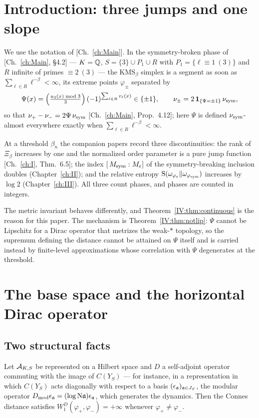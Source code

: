 \section{Introduction: three jumps and one slope}

We use the notation of [Ch.~\ref{ch:Main}]. In the symmetry-broken phase of [Ch.~\ref{ch:Main}, \S4.2] ---
$K=\mathbb{Q}$, $S=\{3\}\cup P_1\cup R$ with $P_1=\{\ell\equiv1\ (3)\}$ and $R$ infinite of primes
$\equiv2\ (3)$ --- the $\mathrm{KMS}_\beta$ simplex is a segment as soon as
$\sum_{\ell\in R}\ell^{-\beta}<\infty$, its extreme points $\varphi_\pm$ separated by
\begin{equation}\label{IV:eq:Psi}
\Psi(x)=\Bigl(\tfrac{u_3(x)\bmod3}{3}\Bigr)\,(-1)^{\sum_{\ell\in R}v_\ell(x)}\in\{\pm1\},
\qquad
\nu_\pm=2\,\mathbf 1_{\{\Psi=\pm1\}}\,\nu_{\mathrm{sym}},
\end{equation}
so that $\nu_+-\nu_-=2\Psi\,\nu_{\mathrm{sym}}$ [Ch.~\ref{ch:Main}, Prop.~4.12]; here $\Psi$ is defined
$\nu_{\mathrm{sym}}$-almost everywhere exactly when $\sum_{\ell\in R}\ell^{-\beta}<\infty$.

At a threshold $\beta_n$ the companion papers record three discontinuities: the rank of
$\Xi_\beta$ increases by one and the normalized order parameter is a pure jump function
[Ch.~\ref{ch:I}, Thm.~6.5]; the index $[\,M_{\mathrm{sym}}:M_\varepsilon]$ of the symmetry-breaking
inclusion doubles (Chapter~\ref{ch:II}); and the relative entropy
$\mathrm{S}(\omega_{\varphi_\varepsilon}\|\omega_{\varphi_{\mathrm{sym}}})$ increases by $\log2$ (Chapter~\ref{ch:III}).
All three count phases, and phases are counted in integers.

The metric invariant behaves differently, and Theorem~\ref{IV:thm:continuous} is the reason for
this paper. The mechanism is Theorem~\ref{IV:thm:notlip}: $\Psi$ cannot be Lipschitz for a
Dirac operator that metrizes the weak-$*$ topology, so the supremum defining the distance
cannot be attained on $\Psi$ itself and is carried instead by finite-level approximations
whose correlation with $\Psi$ degenerates at the threshold.


\section{The base space and the horizontal Dirac operator}

\subsection{Two structural facts}

\begin{proposition}\label{IV:prop:blind}
Let $\mathcal{A}_{K,S}$ be represented on a Hilbert space and $D$ a self-adjoint operator commuting
with the image of $C(Y_S)$ --- for instance, in a representation in which $C(Y_S)$ acts
diagonally with respect to a basis $(\epsilon_{\mathfrak{a}})_{\mathfrak{a}\in J_S}$, the modular operator
$D_{\mathrm{mod}}\epsilon_{\mathfrak{a}}=(\log\mathrm{N}\mathfrak{a})\epsilon_{\mathfrak{a}}$, which generates the dynamics. Then the
Connes distance \cite{Connes89,ConnesBook} satisfies
$W_1^{D}(\varphi_+,\varphi_-)=+\infty$ whenever $\varphi_+\ne\varphi_-$.
\end{proposition}

